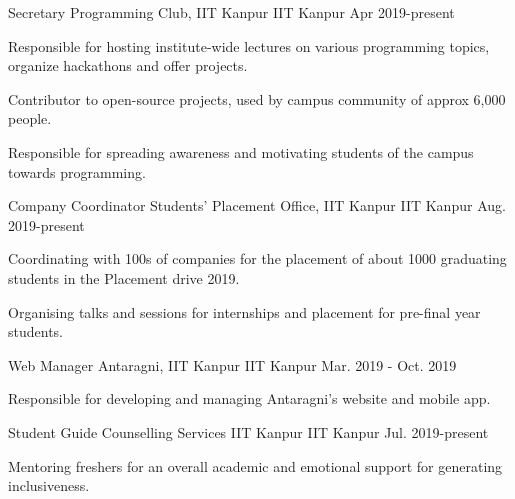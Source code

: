 

\begin{cventries}

  \cventry
    {Secretary} %
    {Programming Club, IIT Kanpur} %
    {IIT Kanpur} %
    {Apr 2019-present} %
    {
      \begin{cvitems} %
        \item {Responsible for hosting institute-wide lectures on various programming topics, organize hackathons and offer projects.}
        \item {Contributor to open-source projects, used by campus community of approx 6,000 people.}
        \item {Responsible for spreading awareness and motivating students of the campus towards programming.}
      \end{cvitems}
    }

  \cventry
    {Company Coordinator} %
    {Students’ Placement Office, IIT Kanpur} %
    {IIT Kanpur} %
    {Aug. 2019-present} %
    {
      \begin{cvitems} %
        \item {Coordinating with 100s of companies for the placement of about 1000 graduating students in the Placement drive 2019.}
        \item {Organising talks and sessions for internships and placement for pre-final year students.}
      \end{cvitems}
    }
    
    
   \cventry
    {Web Manager} %
    {Antaragni, IIT Kanpur} %
    {IIT Kanpur} %
    {Mar. 2019 - Oct. 2019} %
    {
      \begin{cvitems} %
        \item {Responsible for developing and managing Antaragni’s website and mobile app.}
      \end{cvitems}
    }
    
    \cventry
    {Student Guide} %
    {Counselling Services IIT Kanpur} %
    {IIT Kanpur} %
    {Jul. 2019-present} %
    {
      \begin{cvitems} %
        \item {Mentoring freshers for an overall academic and emotional support for generating inclusiveness.}
      \end{cvitems}
    }

\end{cventries}
